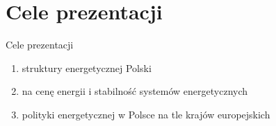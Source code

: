 \section{Cele prezentacji}

\begin{frame}{Cele prezentacji}
    \begin{enumerate}
        \item {} struktury energetycznej Polski
        \vspace{0.3em}
        
        \item {} na cenę energii i stabilność systemów energetycznych  
        \vspace{0.3em}
        
        \item {} polityki energetycznej w Polsce na tle krajów europejskich
    \end{enumerate}
\end{frame}